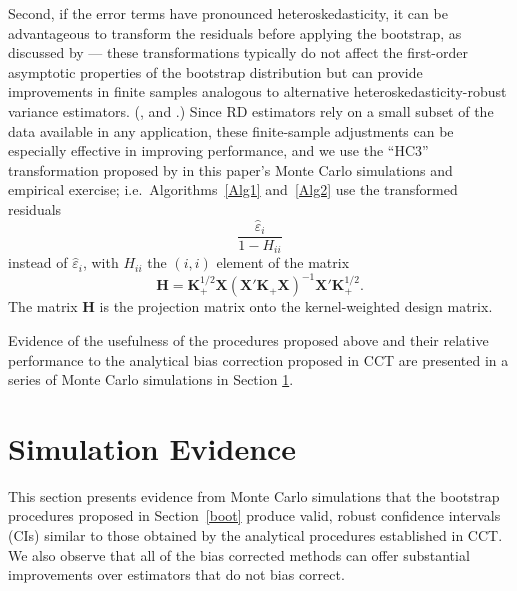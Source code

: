 \documentclass[12pt,fleqn]{article}
\begin{document}
Second, if the error terms have pronounced heteroskedasticity, it can be
advantageous to transform the residuals before applying the bootstrap, as
discussed by \citet{DF08} --- these transformations typically do not affect the
first-order asymptotic properties of the bootstrap distribution but can provide
improvements in finite samples analogous to alternative
heteroskedasticity-robust variance estimators. (\citealp{mackinnon1985some}, and
\citealp{mackinnon2013thirty}.) Since RD estimators rely on a small subset of
the data available in any application, these finite-sample adjustments can be
especially effective in improving performance, and we use the ``HC3''
transformation proposed by \citet{DF08} in this paper's Monte Carlo simulations
and empirical exercise; i.e.\ Algorithms~\ref{Alg1} and~\ref{Alg2} use the
transformed residuals
\begin{equation}\label{eq:14}
  \frac{\hat\varepsilon_i}{1 - H_{ii}}
\end{equation}
instead of $\hat\varepsilon_i$, with $H_{ii}$ the $(i, i)$ element of the matrix
\begin{equation}\label{eq:15}
  \mathbf{H} = \mathbf{K}_+^{1/2} \mathbf{X} (\mathbf{X}' \mathbf{K}_+ \mathbf{X})^{-1} \mathbf{X}' \mathbf{K}_+^{1/2}.
\end{equation}
The matrix $\mathbf{H}$ is the projection matrix onto the kernel-weighted design
matrix.

Evidence of the usefulness of the procedures proposed above and their relative performance to the analytical bias correction proposed in CCT are presented in a series of Monte Carlo simulations in Section \ref{sim}.

\section{Simulation Evidence}\label{sim}
This section presents evidence from Monte Carlo simulations that the bootstrap
procedures proposed in Section~\ref{boot} produce valid, robust confidence
intervals (CIs) similar to those obtained by the analytical procedures established in CCT. 
 We also observe that all of the bias corrected methods can offer substantial improvements over estimators that do not bias correct.
\end{document}
